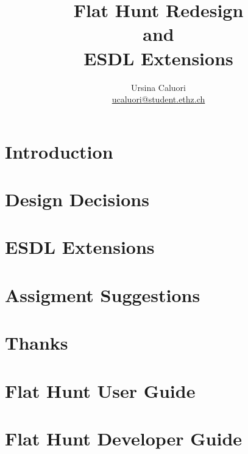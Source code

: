 \documentclass[a4paper,titlepage,12pt]{article}
\title{\textbf{Flat Hunt Redesign \\ and \\ ESDL Extensions}}
\author{Ursina Caluori\\ \href{mailto: ucaluori@student.ethz.ch}{ucaluori@student.ethz.ch}}
\begin{document}
  \maketitle

  \tableofcontents
  
  \pagebreak

  \section{Introduction}
    
  \section{Design Decisions}
    
  \section{\label{esdl_ext}ESDL Extensions}
    
  \section{\label{assignments}Assigment Suggestions}
    
  \section{Thanks}
        

  \hyperref[ref]{}
  
    
  \pagebreak
  
  \appendix
  \section{Flat Hunt User Guide}
  
  
  \pagebreak
  
  \section{Flat Hunt Developer Guide}
   
  
\end{document}
